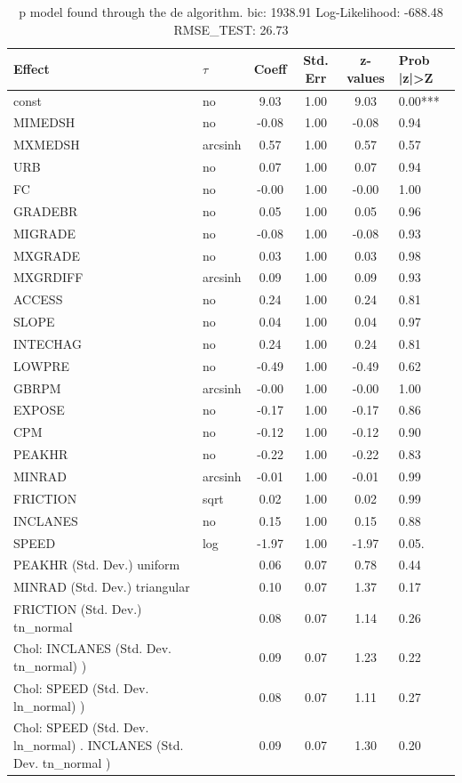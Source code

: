 \begin{table}
	\caption{p model found through the de algorithm. bic: 1938.91 Log-Likelihood: -688.48 RMSE_TEST: 26.73}
	\begin{center}
		\begin{tabular}{|l|l|c|c|c|l|}
			\hline
			Effect & $\tau$ & Coeff & Std. Err & z-values & Prob |z|>Z \\
			\hline
			const & no & 9.03 & 1.00 & 9.03 & 0.00*** \\
			\hline
			MIMEDSH & no & -0.08 & 1.00 & -0.08 & 0.94 \\
			\hline
			MXMEDSH & arcsinh & 0.57 & 1.00 & 0.57 & 0.57 \\
			\hline
			URB & no & 0.07 & 1.00 & 0.07 & 0.94 \\
			\hline
			FC & no & -0.00 & 1.00 & -0.00 & 1.00 \\
			\hline
			GRADEBR & no & 0.05 & 1.00 & 0.05 & 0.96 \\
			\hline
			MIGRADE & no & -0.08 & 1.00 & -0.08 & 0.93 \\
			\hline
			MXGRADE & no & 0.03 & 1.00 & 0.03 & 0.98 \\
			\hline
			MXGRDIFF & arcsinh & 0.09 & 1.00 & 0.09 & 0.93 \\
			\hline
			ACCESS & no & 0.24 & 1.00 & 0.24 & 0.81 \\
			\hline
			SLOPE & no & 0.04 & 1.00 & 0.04 & 0.97 \\
			\hline
			INTECHAG & no & 0.24 & 1.00 & 0.24 & 0.81 \\
			\hline
			LOWPRE & no & -0.49 & 1.00 & -0.49 & 0.62 \\
			\hline
			GBRPM & arcsinh & -0.00 & 1.00 & -0.00 & 1.00 \\
			\hline
			EXPOSE & no & -0.17 & 1.00 & -0.17 & 0.86 \\
			\hline
			CPM & no & -0.12 & 1.00 & -0.12 & 0.90 \\
			\hline
			PEAKHR & no & -0.22 & 1.00 & -0.22 & 0.83 \\
			\hline
			MINRAD & arcsinh & -0.01 & 1.00 & -0.01 & 0.99 \\
			\hline
			FRICTION & sqrt & 0.02 & 1.00 & 0.02 & 0.99 \\
			\hline
			INCLANES & no & 0.15 & 1.00 & 0.15 & 0.88 \\
			\hline
			SPEED & log & -1.97 & 1.00 & -1.97 & 0.05. \\
			\hline
			PEAKHR (Std. Dev.) uniform &  & 0.06 & 0.07 & 0.78 & 0.44 \\
			\hline
			MINRAD (Std. Dev.) triangular &  & 0.10 & 0.07 & 1.37 & 0.17 \\
			\hline
			FRICTION (Std. Dev.) tn_normal &  & 0.08 & 0.07 & 1.14 & 0.26 \\
			\hline
			 Chol: INCLANES (Std. Dev. tn_normal) ) &  & 0.09 & 0.07 & 1.23 & 0.22 \\
			\hline
			 Chol: SPEED (Std. Dev. ln_normal) ) &  & 0.08 & 0.07 & 1.11 & 0.27 \\
			\hline
			 Chol: SPEED (Std. Dev. ln_normal) . INCLANES (Std. Dev.   tn_normal ) &  & 0.09 & 0.07 & 1.30 & 0.20 \\
			\hline
		\end{tabular}
	\end{center}
\end{table}